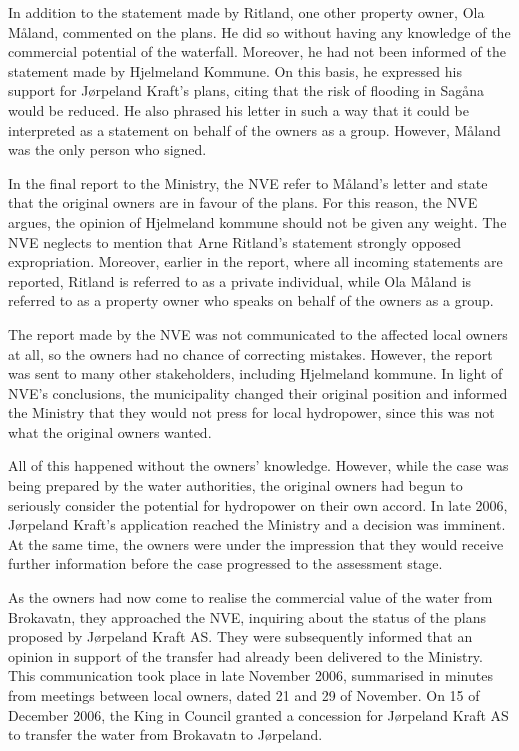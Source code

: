 In addition to the statement made by Ritland, one other property owner, Ola Måland, commented on the plans. He did so without having any knowledge of the commercial potential of the waterfall. Moreover, he had not been informed of the statement made by Hjelmeland Kommune. On this basis, he expressed his support for Jørpeland Kraft's plans, citing that the risk of flooding in Sagåna would be reduced. He also phrased his letter in such a way that it could be interpreted as a statement on behalf of the owners as a group. However, Måland was the only person who signed.

In the final report to the Ministry, the NVE refer to Måland's letter and state that the original owners are in favour of the plans. For this reason, the NVE argues, the opinion of Hjelmeland kommune should not be given any weight. The NVE neglects to mention that Arne Ritland's statement strongly opposed expropriation. Moreover, earlier in the report, where all incoming statements are reported, Ritland is referred to as a private individual, while Ola Måland is referred to as a property owner who speaks on behalf of the owners as a group.

The report made by the NVE was not communicated to the affected local owners at all, so the owners had no chance of correcting mistakes. However, the report was sent to many other stakeholders, including Hjelmeland kommune. In light of NVE's conclusions, the municipality changed their original position and informed the Ministry that they would not press for local hydropower, since this was not what the original owners wanted.

All of this happened without the owners' knowledge. However, while the case was being prepared by the water authorities, the original owners had begun to seriously consider the potential for hydropower on their own accord. In late 2006, Jørpeland Kraft's application reached the Ministry and a decision was imminent. At the same time, the owners were under the impression that they would receive further information before the case progressed to the assessment stage. 

As the owners had now come to realise the commercial value of the water from Brokavatn, they approached the NVE, inquiring about the status of the plans proposed by Jørpeland Kraft AS. They were subsequently informed that an opinion in support of the transfer had already been delivered to the Ministry. This communication took place in late November 2006, summarised in minutes from meetings between local owners, dated 21 and 29 of November. On 15 of December 2006, the King in Council granted a concession for Jørpeland Kraft AS to transfer the water from Brokavatn to Jørpeland.

